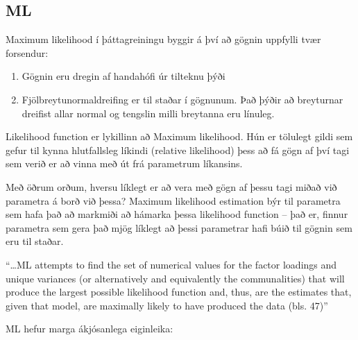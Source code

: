 \documentclass[]{book}
\providecommand{\tightlist}{%
  \setlength{\itemsep}{0pt}\setlength{\parskip}{0pt}}
\begin{document}
\hypertarget{ml}{%
\subsection{ML}\label{ml}}

Maximum likelihood í þáttagreiningu byggir á því að gögnin uppfylli tvær forsendur:

\begin{enumerate}
\def\labelenumi{\arabic{enumi})}
\tightlist
\item
  Gögnin eru dregin af handahófi úr tilteknu þýði
\item
  Fjölbreytunormaldreifing er til staðar í gögnunum. Það þýðir að breyturnar dreifist allar normal og tengslin milli breytanna eru línuleg.
\end{enumerate}

Likelihood function er lykillinn að Maximum likelihood. Hún er tölulegt gildi sem gefur til kynna hlutfallsleg líkindi (relative likelihood) þess að fá gögn af því tagi sem verið er að vinna með út frá parametrum líkansins.

Með öðrum orðum, hversu líklegt er að vera með gögn af þessu tagi miðað við parametra á borð við þessa? Maximum likelihood estimation býr til parametra sem hafa það að markmiði að hámarka þessa likelihood function -- það er, finnur parametra sem gera það mjög líklegt að þessi parametrar hafi búið til gögnin sem eru til staðar.

``\ldots{}ML attempts to find the set of numerical values for the factor loadings and unique variances (or alternatively and equivalently the communalities) that will produce the largest possible likelihood function and, thus, are the estimates that, given that model, are maximally likely to have produced the data (bls. 47)''

ML hefur marga ákjósanlega eiginleika:
\end{document}
